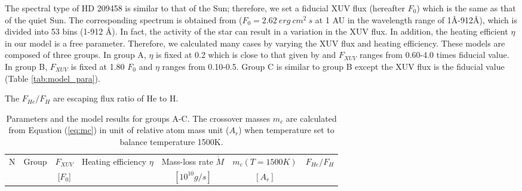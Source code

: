 \documentclass[journal, onecolumn]{aastex631}
\begin{document}
\begin{CJK*}{UTF8}{gbsn}
The spectral type of HD 209458 is similar to that of the Sun; therefore, we set a fiducial XUV flux (hereafter $F_{0}$) which is the same as that of the quiet Sun. The corresponding spectrum is obtained from \cite{Guo2016}($F_{0} = 2.62\ erg\ cm^2\ s$ at 1 AU in the wavelength range of 1\AA-912\AA), which is divided into 53 bins (1-912 \AA). In fact, the activity of the star can result in a variation in the XUV flux. In addition, the heating efficient $\eta$ in our model is a free parameter. Therefore, we calculated many cases by varying the XUV flux and heating efficiency. These models are composed of three groups. In group A, $\eta$ is fixed at 0.2 which is close to that given by \cite{Shematovich2014} and $F_{XUV}$ ranges from 0.60-4.0 times fiducial value. In group B, $F_{XUV}$ is fixed at 1.80 $F_{0}$ and $\eta$ ranges from 0.10-0.5. Group C is similar to group B except the XUV flux is the fiducial value (Table \ref{tab:model_para}).

\begin{table}[!t]
\begin{center}
\begin{threeparttable}[t]
\caption{Parameters and the model results for groups A-C. The crossover masses $m_c$ are calculated from Equation (\ref{eq:mc}) in unit of relative atom mass unit ($A_r$) when temperature set to balance temperature 1500K.} The $F_{He}/F_H$ are escaping flux ratio of He to H.

\begin{tabular}{ccccccc}
\toprule
 N& Group& $F_{XUV}$& Heating efficiency $\eta$& Mass-loss rate $\dot{M}$& $m_c(T=1500K)$& $F_{He}/F_{H}$\\
 & & [$F_{0}$]& & $[10^{10}g/s]$& $[A_{r}]$\\


\end{tabular}
\end{threeparttable}
\end{center}
\end{table}
\end{CJK*}
\end{document}
